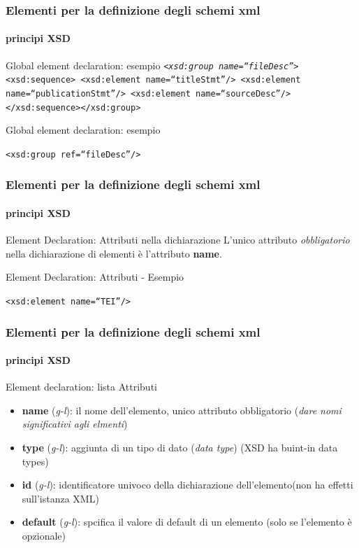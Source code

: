 \begin{frame}
	\frametitle{Elementi per la definizione degli schemi xml}
	\framesubtitle{principi XSD}
	\addtocounter{nframe}{1}


	\begin{block}{Global element declaration: esempio}
		\texttt{\emph{<xsd:group name=``fileDesc''>}
			<xsd:sequence>
			<xsd:element name=``titleStmt''/>
			<xsd:element name=``publicationStmt''/>
			<xsd:element name=``sourceDesc''/>
			</xsd:sequence></xsd:group>
		}
	\end{block}

	\begin{block}{Global element declaration: esempio}
		\begin{center} \texttt{<xsd:group ref=``fileDesc''/>}\end{center}
	\end{block}

\end{frame}

\begin{frame}
	\frametitle{Elementi per la definizione degli schemi xml}
	\framesubtitle{principi XSD}
	\addtocounter{nframe}{1}

	\begin{block}{Element Declaration: Attributi nella dichiarazione}
		L'unico attributo \textit{obbligatorio} nella dichiarazione di elementi è l'attributo \textbf{name}.
	\end{block}

	\begin{block}{Element Declaration: Attributi - Esempio}
		\begin{center}\texttt{<xsd:element name=``TEI''/> }\end{center}
	\end{block}

\end{frame}

\begin{frame}
	\frametitle{Elementi per la definizione degli schemi xml}
	\framesubtitle{principi XSD}
	\addtocounter{nframe}{1}

	\begin{block}{Element declaration: lista Attributi}
		\begin{itemize}
			\item \textbf{name} (\textit{g-l}): il nome dell'elemento, unico attributo obbligatorio (\textit{dare nomi significativi agli elmenti})
			\item \textbf{type} (\textit{g-l}): aggiunta di un tipo di dato (\textit{data type}) (XSD ha buint-in data types)
			\item \textbf{id} (\textit{g-l}): identificatore univoco della dichiarazione dell'elemento(non ha effetti sull'istanza XML)
			\item \textbf{default} (\textit{g-l}): spcifica il valore di default di un elemento (solo se l'elemento è opzionale)
		\end{itemize}

	\end{block}

\end{frame}

